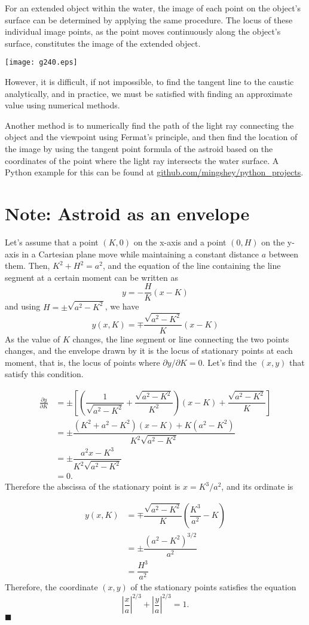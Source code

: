 \documentclass[twocolumn]{article}
\begin{document}
For an extended object within the water, the image of each point on the object's 
surface can be determined by applying the same procedure. The locus of these 
individual image points, as the point moves continuously along the object's 
surface, constitutes the image of the extended object.

\texttt{[image: g240.eps]}

However, it is difficult, if not impossible, to find the tangent line to the caustic analytically, and 
in practice, we must be satisfied with finding an approximate value using numerical 
methods.

Another method is to numerically find the path of the light ray connecting the object 
and the viewpoint using Fermat's principle, and then find the location of the image 
by using the tangent point formula of the astroid based on the coordinates of the 
point where the light ray intersects the water surface. A Python example for this can 
be found at \href{https://github.com/mingshey/python_projects/blob/main/Refraction_Image_en.ipynb}%
{github.com/mingshey/python\_projects}.

\appendix
\newcommand{\pardiff}[2]{{\frac{\partial #1}{\partial #2}}}
\newcommand{\ilpardiff}[2]{{{\partial #1}/{\partial #2}}}
\section*{Note: Astroid as an envelope}
Let's assume that a point $(K, 0)$ on the x-axis and a point $(0, H)$ on the y-axis in a Cartesian plane move while maintaining a constant distance $a$ between them. Then, $K^2+H^2=a^2$, and the equation of the line containing the line segment at a certain moment can be written as
$$y=-\dfrac{H}{K}(x-K)$$
and using $H=\pm \sqrt{a^2-K^2}$, we have
$$y(x, K) = \mp \dfrac{\sqrt{a^2-K^2}}{K}(x-K)$$
As the value of $K$ changes, the line segment or line connecting the two points changes, and the envelope drawn by it is the locus of stationary points at each moment, that is, the locus of points where $\ilpardiff{y}{K} = 0$. Let's find the $(x, y)$ that satisfy this condition.

$$ \begin{aligned}
	\pardiff{y}{K} &= \pm\left[\left( \dfrac{1}{\sqrt{a^2-K^2}}+\dfrac{\sqrt{a^2-K^2}}{K^2}\right) (x-K) + \dfrac{\sqrt{a^2-K^2}}{K} \right]\\
	&= \pm \dfrac{(K^2+a^2-K^2)(x-K)+K(a^2-K^2)}{K^2\sqrt{a^2-K^2}}\\
	&= \pm \dfrac{a^2 x - K^3}{K^2 \sqrt{a^2 - K^2}}\\
	&= 0.
\end{aligned}
$$
Therefore the abscissa of the stationary point is $x = K^3/a^2$, and its ordinate is

$$ \begin{aligned}
	y(x, K) &= \mp \dfrac{\sqrt{a^2-K^2}}{K}\left(\dfrac{K^3}{a^2}-K\right)\\
	& = \pm \dfrac{\left( a^2- K^2 \right)^{3/2}}{a^2}\\
	& = \dfrac{H^3}{a^2}
\end{aligned}
$$
Therefore, the coordinate $(x, y)$ of the stationary points satisfies the equation
$$ \left|\dfrac{x}{a}\right|^{2/3} + \left|\dfrac{y}{a}\right|^{2/3} = 1. $$
$\blacksquare$
\end{document}
